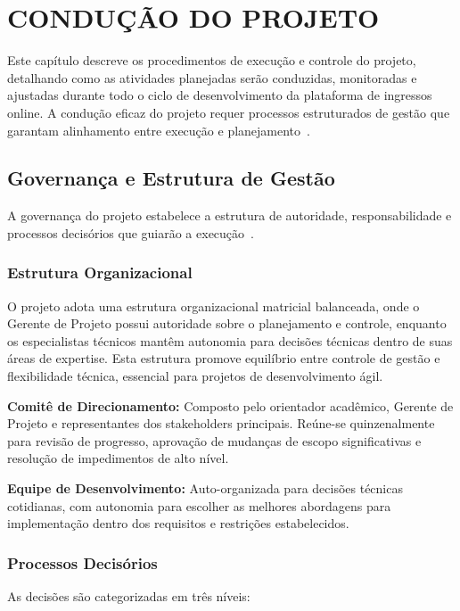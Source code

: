 \chapter{CONDUÇÃO DO PROJETO}

Este capítulo descreve os procedimentos de execução e controle do projeto, detalhando como as atividades planejadas serão conduzidas, monitoradas e ajustadas durante todo o ciclo de desenvolvimento da plataforma de ingressos online. A condução eficaz do projeto requer processos estruturados de gestão que garantam alinhamento entre execução e planejamento~\cite{PMI:2021}.

\section{Governança e Estrutura de Gestão}

A governança do projeto estabelece a estrutura de autoridade, responsabilidade e processos decisórios que guiarão a execução~\cite{Kerzner:2022}.

\subsection{Estrutura Organizacional}

O projeto adota uma estrutura organizacional matricial balanceada, onde o Gerente de Projeto possui autoridade sobre o planejamento e controle, enquanto os especialistas técnicos mantêm autonomia para decisões técnicas dentro de suas áreas de expertise. Esta estrutura promove equilíbrio entre controle de gestão e flexibilidade técnica, essencial para projetos de desenvolvimento ágil.

\textbf{Comitê de Direcionamento:} Composto pelo orientador acadêmico, Gerente de Projeto e representantes dos stakeholders principais. Reúne-se quinzenalmente para revisão de progresso, aprovação de mudanças de escopo significativas e resolução de impedimentos de alto nível.

\textbf{Equipe de Desenvolvimento:} Auto-organizada para decisões técnicas cotidianas, com autonomia para escolher as melhores abordagens para implementação dentro dos requisitos e restrições estabelecidos.

\subsection{Processos Decisórios}

As decisões são categorizadas em três níveis:

